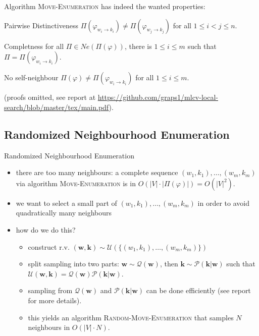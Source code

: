 \documentclass[10pt]{beamer}
\newcommand{\wf}{\mathbf{w}}
\newcommand{\kf}{\mathbf{k}}
\newcommand{\Qc}{\mathcal{Q}}
\newcommand{\Uc}{\mathcal{U}}
\newcommand{\Pc}{\mathcal{P}}
\newcommand{\idx}{\varphi}
\newcommand{\move}[3]{#1_{#2\rightarrow #3}}
\begin{document}
\begin{frame}
    Algorithm \textsc{Move-Enumeration} has indeed the wanted properties:
    \begin{block}{Pairwise Distinctiveness}
        $\Pi(\move{\idx}{w_i}{k_i}) \neq \Pi(\move{\idx}{w_j}{k_j})$ for all $1 \leq i < j \leq n$.
    \end{block}
    \begin{block}{Completness}
        for all $\Pi \in Ne(\Pi(\idx))$, there is $1 \leq i \leq m$ such that $\Pi = \Pi(\move{\idx}{w_i}{k_i})$.
    \end{block}
    \begin{block}{No self-neighbour}
        $\Pi(\idx) \neq \Pi(\move{\idx}{w_i}{k_i})$ for all $1 \leq i \leq m$.
    \end{block}
    (proofs omitted, see report at \url{https://github.com/graps1/mlcv-local-search/blob/master/tex/main.pdf}).
\end{frame}

\subsection*{Randomized Neighbourhood Enumeration}
\begin{frame}{Randomized Neighbourhood Enumeration}
    \begin{itemize}
        \item there are too many neighbours: a complete sequence $(w_1,k_1),\dots,(w_m,k_m)$ via algorithm \textsc{Move-Enumeration} is in $O(|V|\cdot |\Pi(\idx)|) = O(|V|^2)$.
        \item we want to select a small part of $(w_1,k_1),\dots,(w_m,k_m)$ in order to avoid quadratically many neighbours
        \item how do we do this?
        \pause
        \begin{itemize} 
            \item construct r.v. $(\wf, \kf) \sim \Uc(\{(w_1,k_1),\dots,(w_m,k_m)\})$
            \item split sampling into two parts: $\wf \sim \Qc(\wf)$, then $\kf \sim \Pc(\kf | \wf)$ such that $\Uc(\wf, \kf) = \Qc(\wf)\Pc(\kf|\wf)$.
            \item sampling from $\Qc(\wf)$ and $\Pc(\kf|\wf)$ can be done efficiently (see report for more details).
            \item this yields an algorithm \textsc{Random-Move-Enumeration} that samples $N$ neighbours in $O(|V|\cdot N)$.
        \end{itemize}
    \end{itemize}
\end{frame}
\end{document}
